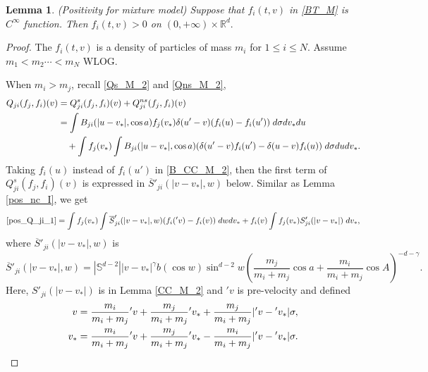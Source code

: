\documentclass[reqno,10pt]{amsart}
\newtheorem{lemma}[theorem]{Lemma}
\numberwithin{equation}{section}
\begin{document}
\begin{lemma} (Positivity for mixture model) \label{pos_nc_M}
Suppose that $f_i(t,v)$ in \eqref{BT_M} is $C^{\infty}$ function. Then $f_i(t,v)>0$ on $(0,+\infty)\times \mathbb{R}^{d}.$ 
\end{lemma}
\begin{proof}
The $f_i(t,v)$ is a density of particles of mass $m_i$ for $1 \leq i \leq N$. Assume $m_1<m_2 \cdots < m_N$ WLOG. \vspace{3mm}

\noindent When $m_i>m_j$, recall \eqref{Qs_M_2} and \eqref{Qns_M_2}, 
\begin{align}
    Q_{ji}(f_j,f_i)(v) &= Q^{s}_{ji}(f_j,f_i)(v) + Q^{ns}_{ji}(f_j,f_i)(v) \notag \\ 
     &=\int B_{ji}(|u-v_*|, \cos a)f_j(v_*)\delta(u'-v)(f_i(u)-f_i(u'))\; d\sigma dv_*du \notag \\ 
     &\quad+\int f_j(v_*)\int B_{ji}(|u-v_*|, \cos a)(\delta(u'-v)f_i(u')-\delta(u-v)f_i(u)) \; d\sigma du dv_*. \label{pos_Q_ji_1}
\end{align}
\noindent Taking $f_i(u)$ instead of $f_i(u')$ in \eqref{B_CC_M_2}, then the first term of $Q_{ji}^{s}(f_j,f_i)(v)$ is expressed in $\overline{S}'_{ji}(|v-v_*|,w)$ below. 
Similar as Lemma \ref{pos_nc_I}, we get
\begin{align}
     \eqref{pos_Q_ji_1}
     =\int f_j(v_*) \int \overline{S}'_{ji}(|v-v_*|,w)(f_i('v)-f_i(v)) \;dwdv_* 
+ f_i(v)\int f_j(v_*)S'_{ji}(|v-v_*|)  \;dv_*,   \label{S'_pos_nc_M}
\end{align}
where $\overline{S}'_{ji}(|v-v_*|,w)$ is 
\begin{equation*}
    \overline{S}'_{ji}(|v-v_*|,w)=|\mathbb{S}^{d-2}||v-v_*|^{\gamma}b(\cos w)\sin^{d-2}w(\frac{m_j}{m_i+m_j}\cos a + \frac{m_i}{m_i+m_j}\cos A)^{-d-\gamma}.
\end{equation*}
Here, $S'_{ji}(|v-v_*|)$ is in Lemma \ref{CC_M_2} and $'v$ is pre-velocity and defined 
\begin{align*} 
    v &= \frac{m_i}{m_i+m_j}{'v}+\frac{m_j}{m_i+m_j}{'v_*}+\frac{m_j}{m_i+m_j}|'v-{'v_*}|\sigma, \notag \\
    v_* &=\frac{m_i}{m_i+m_j}{'v}+\frac{m_j}{m_i+m_j}{'v_*}-\frac{m_i}{m_i+m_j}|'v-{'v_*}|\sigma.
\end{align*} \vspace{3mm}


\end{proof}
\end{document}

